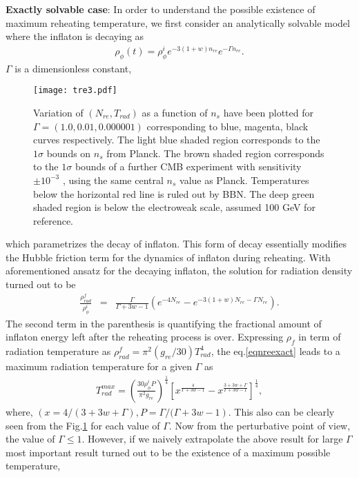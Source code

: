 \documentclass[prl,twocolumn,superscriptaddress,doublespace]{revtex4}%
\def\bea{\begin{eqnarray}}
\def\eea{\end{eqnarray}}
\begin{document}
{\bf Exactly solvable case}: In order to understand the possible existence of maximum reheating temperature, we first consider an analytically solvable model where the inflaton is decaying as
\bea
\rho_{\phi}(t) =  \rho^i_{\phi} e^{-3(1+w)n_{re}} e^{-\Gamma n_{re}} .
\eea 
$\Gamma$ is a dimensionless constant,
\begin{figure}[t!]
	\begin{center}
		\texttt{[image: tre3.pdf]}
		\caption{\scriptsize Variation of $(N_{re},T_{rad})$ as a function of $n_s$ have been plotted for $\Gamma = (1.0,0.01, 0.000001)$ corresponding to 		blue, magenta, black curves respectively. The light blue shaded region 
			corresponds to the $1 \sigma$ bounds on $n_s$ from Planck. The brown shaded region corresponds to the $1 \sigma$
			bounds of a further CMB experiment with sensitivity $\pm 10^{-3}$ \cite{limit1,limit2}, using the same central $n_s$ value as
			Planck. Temperatures below the horizontal red line is ruled out by BBN. The deep green shaded region is below the 
			electroweak scale, assumed 100 GeV for reference.} 
		\label{plotexact}
	\end{center}
\end{figure} 
which parametrizes the decay of inflaton. This form of decay essentially modifies the Hubble friction term for the dynamics of inflaton during reheating. With aforementioned ansatz for the decaying inflaton, the solution for radiation density turned out to be 
\bea \label{eqnreexact}
\frac{\rho^f_{rad}}{\rho^i_{\phi}} &=& \frac{\Gamma }{\Gamma  + 3 w -1} \left(e^{-4 N_{re}} -
e^{-3(1+w)N_{re} -\Gamma N_{re}} \right). 
\eea
The second term in the parenthesis is quantifying the fractional amount of inflaton energy
left after the reheating process is over. Expressing  $\rho_f$ in term of radiation temperature as $\rho_{rad}^f=\pi^2 (g_{re}/30) T_{rad}^4$, the eq.\ref{eqnreexact} leads to a maximum radiation temperature for a given $\Gamma$ as   
\bea \label{tmaxexact}
T_{rad}^{max} = \left(\frac{30 \rho^i_{\phi} P}{\pi^2 g_{re}} \right)^{\frac 1 4} \left[x^{\frac {4}{\Gamma +3w-1}}-x^{\frac{3+3w+\Gamma}{\Gamma +3w-1}}
	\right]^{\frac 1 4} ,
\eea
where, $(x = 4/(3+3w+\Gamma), P ={\Gamma }/{(\Gamma  + 3 w -1})$. This also can be clearly seen from the Fig.\ref{plotexact} for each value of $\Gamma$. Now from the perturbative point of view, the value of $\Gamma \leq 1$. However, if we naively extrapolate the above result for large $\Gamma$ most important result turned out to be the existence of a maximum possible temperature, 
\end{document}
